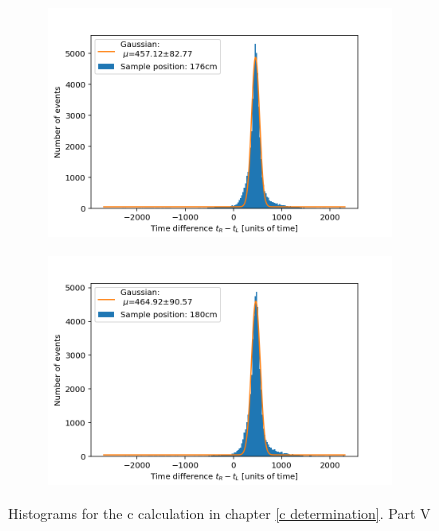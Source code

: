 \documentclass[]{article}
\begin{document}
\begin{figure}[H]
\medskip
\begin{subfigure}{0.48\textwidth}
\includegraphics[width=\linewidth]{Plots/Pos/176cm.png}
\end{subfigure}
\begin{subfigure}[c]{0.48\linewidth}
\includegraphics[width=\linewidth]{Plots/Pos/180cm.png}
\end{subfigure}
\caption{Histograms for the c calculation in chapter \ref{c determination}. Part V }
\end{figure}
\end{document}

